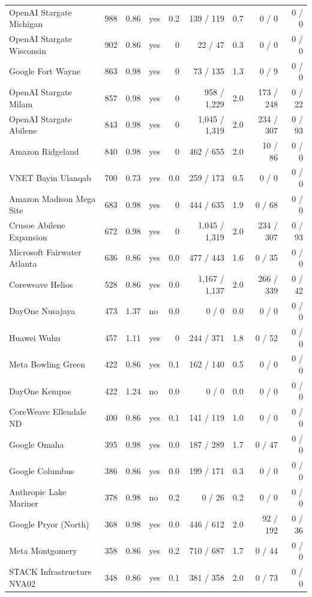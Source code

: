 {\begin{longtable}{@{}lrrlrrrrr@{}}
OpenAI Stargate Michigan & 988 & 0.86 & yes & 0.2 & 139 / 119 & 0.7 & 0 / 0 & 0 / 0 \\
OpenAI Stargate Wisconsin & 902 & 0.86 & yes & 0 & 22 / 47 & 0.3 & 0 / 0 & 0 / 0 \\
Google Fort Wayne & 863 & 0.98 & yes & 0 & 73 / 135 & 1.3 & 0 / 9 & 0 / 0 \\
OpenAI Stargate Milam & 857 & 0.98 & yes & 0 & 958 / 1,229 & 2.0 & 173 / 248 & 0 / 22 \\
OpenAI Stargate Abilene & 843 & 0.98 & yes & 0 & 1,045 / 1,319 & 2.0 & 234 / 307 & 0 / 93 \\
Amazon Ridgeland & 840 & 0.98 & yes & 0 & 462 / 655 & 2.0 & 10 / 86 & 0 / 0 \\
VNET Bayin Ulanqab & 700 & 0.73 & yes & 0.0 & 259 / 173 & 0.5 & 0 / 0 & 0 / 0 \\
Amazon Madison Mega Site & 683 & 0.98 & yes & 0 & 444 / 635 & 1.9 & 0 / 68 & 0 / 0 \\
Crusoe Abilene Expansion & 672 & 0.98 & yes & 0 & 1,045 / 1,319 & 2.0 & 234 / 307 & 0 / 93 \\
Microsoft Fairwater Atlanta & 636 & 0.86 & yes & 0.0 & 477 / 443 & 1.6 & 0 / 35 & 0 / 0 \\
Coreweave Helios & 528 & 0.86 & yes & 0.0 & 1,167 / 1,137 & 2.0 & 266 / 339 & 0 / 42 \\
DayOne Nusajaya & 473 & 1.37 & no & 0.0 & 0 / 0 & 0.0 & 0 / 0 & 0 / 0 \\
Huawei Wuhu & 457 & 1.11 & yes & 0 & 244 / 371 & 1.8 & 0 / 52 & 0 / 0 \\
Meta Bowling Green & 422 & 0.86 & yes & 0.1 & 162 / 140 & 0.5 & 0 / 0 & 0 / 0 \\
DayOne Kempas & 422 & 1.24 & no & 0.0 & 0 / 0 & 0.0 & 0 / 0 & 0 / 0 \\
CoreWeave Ellendale ND & 400 & 0.86 & yes & 0.1 & 141 / 119 & 1.0 & 0 / 0 & 0 / 0 \\
Google Omaha & 395 & 0.98 & yes & 0.0 & 187 / 289 & 1.7 & 0 / 47 & 0 / 0 \\
Google Columbus & 386 & 0.86 & yes & 0.0 & 199 / 171 & 0.3 & 0 / 0 & 0 / 0 \\
Anthropic Lake Mariner & 378 & 0.98 & no & 0.2 & 0 / 26 & 0.2 & 0 / 0 & 0 / 0 \\
Google Pryor (North) & 368 & 0.98 & yes & 0.0 & 446 / 612 & 2.0 & 92 / 192 & 0 / 36 \\
Meta Montgomery & 358 & 0.86 & yes & 0.2 & 710 / 687 & 1.7 & 0 / 44 & 0 / 0 \\
STACK Infrastructure NVA02 & 348 & 0.86 & yes & 0.1 & 381 / 358 & 2.0 & 0 / 73 & 0 / 0 \\

\end{longtable}}
